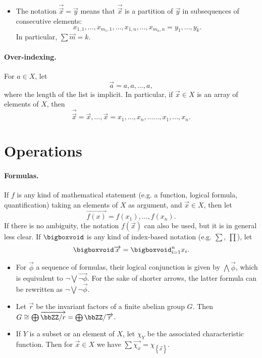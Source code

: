 \documentclass[a4paper, 8pt]{article}
\begin{document}
\begin{multicols}{2}
\begin{examples*}
	\begin{itemize}
		\item The notation $\overrightarrow{\overrightarrow{x}} = \overrightarrow{y}$ means that $\overrightarrow{\overrightarrow{x}}$ is a partition of $\overrightarrow{y}$ in subsequences of consecutive elements:
			\[ x_{1, 1}, \ldots, x_{m_1, 1}, \ldots, x_{1, n}, \ldots, x_{m_n, n} = y_1, \ldots, y_k . \]
			In particular, $\sum \overrightarrow{m} = k$.
	\end{itemize}
\end{examples*}

\paragraph{Over-indexing.} For $a \in X$, let
\[ \overrightarrow{a} = a, a, \ldots, a, \]
where the length of the list is implicit. In particular, if $\overrightarrow{x} \in X$ is an array of elements of $X$, then
\[ \overrightarrow{\overrightarrow{x}} = \overrightarrow{x}, \ldots, \overrightarrow{x} = x_1, \ldots, x_n, \ldots \ldots, x_1, \ldots, x_n . \]

\section{Operations}

\paragraph{Formulas.} If $f$ is any kind of mathematical statement (e.g. a function, logical formula, quantification) taking an elements of $X$ as argument, and $\overrightarrow{x} \in X$, then let
\[ \overrightarrow{f (x)} = f (x_1), \ldots, f (x_n) . \]
If there is no ambiguity, the notation $f (\overrightarrow{x})$ can also be used, but it is in general less clear. If $\bigboxvoid$ is any kind of index-based notation (e.g. $\sum$, $\prod$), let
\[ \bigboxvoid \overrightarrow{x} = \bigboxvoid_{i = 1}^n x_i . \]

\begin{examples*}
	\begin{itemize}
		\item For $\overrightarrow{\phi}$ a sequence of formulas, their logical conjunction is given by $\bigwedge \overrightarrow{\phi}$, which is equivalent to $\neg \bigvee \overrightarrow{\neg \phi}$. For the sake of shorter arrows, the latter formula can be rewritten as $\neg \bigvee \neg \overrightarrow{\phi}$.
		\item Let $\overrightarrow{r}$ be the invariant factors of a finite abelian group $G$. Then $G \cong \bigoplus \overrightarrow{\bbZZ / r} = \bigoplus \bbZZ / \overrightarrow{r}$.
		\item If $Y$ is a subset or an element of $X$, let $\chi_Y$ be the associated characteristic function. Then for $\overrightarrow{x} \in X$ we have $\sum \overrightarrow{\chi_x} = \chi_{\left\lbrace\overrightarrow{x}\right\rbrace}$.
	\end{itemize}
\end{examples*}


\end{multicols}
\end{document}
